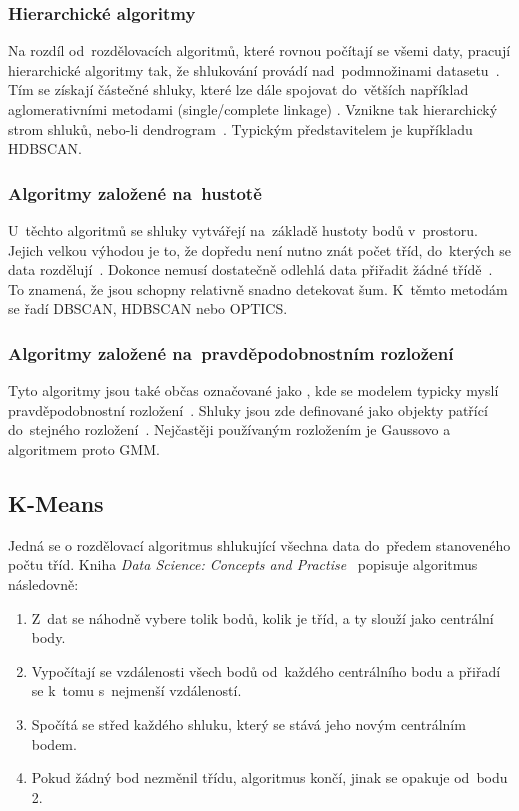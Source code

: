 \subsubsection{Hierarchické algoritmy}
Na rozdíl od~rozdělovacích algoritmů, které rovnou počítají se všemi daty, pracují hierarchické algoritmy tak, že shlukování provádí nad~podmnožinami datasetu~\cite{cluster-methods-article}. Tím se získají částečné shluky, které lze dále spojovat do~větších například aglomerativními metodami (single/complete linkage) \cite{cluster-methods-article}. Vznikne tak hierarchický strom shluků, nebo-li dendrogram~\cite{cluster-methods-book, cluster-methods-article}.
Typickým představitelem je kupříkladu HDBSCAN.

\subsubsection{Algoritmy založené na~hustotě}
U~těchto algoritmů se shluky vytvářejí na~základě hustoty bodů v~prostoru. Jejich velkou výhodou je to, že dopředu není nutno znát počet tříd, do~kterých se data rozdělují~\cite{cluster-methods-book}. Dokonce nemusí dostatečně odlehlá data přiřadit žádné třídě~\cite{cluster-methods-book}. To znamená, že jsou schopny relativně snadno detekovat šum. K~těmto metodám se řadí DBSCAN, HDBSCAN nebo OPTICS.

\subsubsection{Algoritmy založené na~pravděpodobnostním rozložení}
Tyto algoritmy jsou také občas označované jako , kde se modelem typicky myslí pravděpodobnostní rozložení~\cite{cluster-methods-book}. Shluky jsou zde definované jako objekty patřící do~stejného rozložení~\cite{cluster-methods-book}. Nejčastěji používaným rozložením je Gaussovo a algoritmem proto GMM.

\subsection{K-Means}
Jedná se o rozdělovací algoritmus shlukující všechna data do~předem stanoveného počtu tříd. Kniha \emph{Data Science: Concepts and Practise}~\cite{data-science-concepts-and-practice} popisuje algoritmus následovně:

\begin{enumerate}
    \item Z~dat se náhodně vybere tolik bodů, kolik je tříd, a ty slouží jako centrální body.
    \item Vypočítají se vzdálenosti všech bodů od~každého centrálního bodu a přiřadí se k~tomu s~nejmenší vzdáleností.
    \item Spočítá se střed každého shluku, který se stává jeho novým centrálním bodem.
    \item Pokud žádný bod nezměnil třídu, algoritmus končí, jinak se opakuje od~bodu 2.
\end{enumerate}

